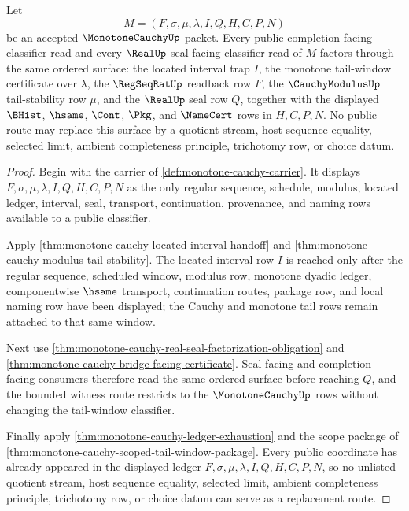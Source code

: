 \begin{theorem}
\label{thm:monotone-cauchy-public-route-classifier-handoff}
Let
$$
M=(F,\sigma,\mu,\lambda,I,Q,H,C,P,N)
$$
be an accepted $\MonotoneCauchyUp$ packet. Every public completion-facing
classifier read and every $\RealUp$ seal-facing classifier read of $M$ factors
through the same ordered surface: the located interval trap $I$, the monotone
tail-window certificate over $\lambda$, the $\RegSeqRatUp$ readback row $F$,
the $\CauchyModulusUp$ tail-stability row $\mu$, and the $\RealUp$ seal row
$Q$, together with the displayed $\BHist$, $\hsame$, $\Cont$, $\Pkg$, and
$\NameCert$ rows in $H,C,P,N$. No public route may replace this surface by a
quotient stream, host sequence equality, selected limit, ambient completeness
principle, trichotomy row, or choice datum.
\end{theorem}
\begin{proof}
Begin with the carrier of \autoref{def:monotone-cauchy-carrier}. It displays
$F,\sigma,\mu,\lambda,I,Q,H,C,P,N$ as the only regular sequence, schedule,
modulus, located ledger, interval, seal, transport, continuation, provenance,
and naming rows available to a public classifier.

Apply \autoref{thm:monotone-cauchy-located-interval-handoff} and
\autoref{thm:monotone-cauchy-modulus-tail-stability}. The located interval row
$I$ is reached only after the regular sequence, scheduled window, modulus row,
monotone dyadic ledger, componentwise $\hsame$ transport, continuation routes,
package row, and local naming row have been displayed; the Cauchy and monotone
tail rows remain attached to that same window.

Next use \autoref{thm:monotone-cauchy-real-seal-factorization-obligation} and
\autoref{thm:monotone-cauchy-bridge-facing-certificate}. Seal-facing and
completion-facing consumers therefore read the same ordered surface before
reaching $Q$, and the bounded witness route restricts to the
$\MonotoneCauchyUp$ rows without changing the tail-window classifier.

Finally apply \autoref{thm:monotone-cauchy-ledger-exhaustion} and the scope
package of \autoref{thm:monotone-cauchy-scoped-tail-window-package}. Every
public coordinate has already appeared in the displayed ledger
$F,\sigma,\mu,\lambda,I,Q,H,C,P,N$, so no unlisted quotient stream, host
sequence equality, selected limit, ambient completeness principle, trichotomy
row, or choice datum can serve as a replacement route.
\end{proof}

